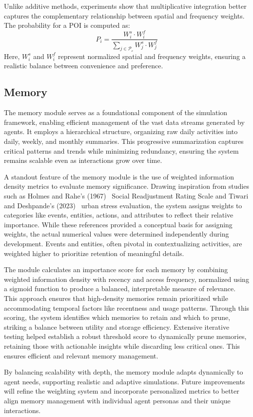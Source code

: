 Unlike additive methods, experiments show that multiplicative integration better captures the complementary relationship between spatial and frequency weights. The probability for a POI is computed as:
\begin{equation}
   P_i = \frac{W^s_i \cdot W^f_i}{\sum_{j \in \mathcal{P_c}} W^s_j \cdot W^f_j}
\end{equation}
Here, $W^s_i$ and $W^f_i$ represent normalized spatial and frequency weights, ensuring a realistic balance between convenience and preference.

\subsection{Memory}
The memory module serves as a foundational component of the simulation framework, enabling efficient management of the vast data streams generated by agents. It employs a hierarchical structure, organizing raw daily activities into daily, weekly, and monthly summaries. This progressive summarization captures critical patterns and trends while minimizing redundancy, ensuring the system remains scalable even as interactions grow over time. 

A standout feature of the memory module is the use of weighted information density metrics to evaluate memory significance. Drawing inspiration from studies such as Holmes and Rahe’s (1967)~\cite{social} Social Readjustment Rating Scale and Tiwari and Deshpande’s (2023)~\cite{urban} urban stress evaluation, the system assigns weights to categories like events, entities, actions, and attributes to reflect their relative importance. While these references provided a conceptual basis for assigning weights, the actual numerical values were determined independently during development. Events and entities, often pivotal in contextualizing activities, are weighted higher to prioritize retention of meaningful details. 

The module calculates an importance score for each memory by combining weighted information density with recency and access frequency, normalized using a sigmoid function to produce a balanced, interpretable measure of relevance. This approach ensures that high-density memories remain prioritized while accommodating temporal factors like recentness and usage patterns. Through this scoring, the system identifies which memories to retain and which to prune, striking a balance between utility and storage efficiency. Extensive iterative testing helped establish a robust threshold score to dynamically prune memories, retaining those with actionable insights while discarding less critical ones. This ensures efficient and relevant memory management.

By balancing scalability with depth, the memory module adapts dynamically to agent needs, supporting realistic and adaptive simulations. Future improvements will refine the weighting system and incorporate personalized metrics to better align memory management with individual agent personas and their unique interactions.
